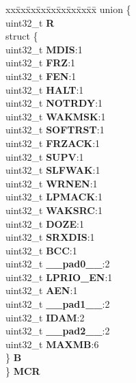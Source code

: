 \begin{DoxyCompactItemize}
\begin{tabbing}
\end{tabbing}\item 
\mbox{\label{structFLEXCAN__tag_a0b0c0058de992e9a9ad5708346fd0e9e}} 
\begin{tabbing}
xx\=xx\=xx\=xx\=xx\=xx\=xx\=xx\=xx\=\kill
union \{\\
\>uint32\_t {\bfseries R}\\
\>struct \{\\
\>\>uint32\_t {\bfseries MDIS}:1\\
\>\>uint32\_t {\bfseries FRZ}:1\\
\>\>uint32\_t {\bfseries FEN}:1\\
\>\>uint32\_t {\bfseries HALT}:1\\
\>\>uint32\_t {\bfseries NOTRDY}:1\\
\>\>uint32\_t {\bfseries WAKMSK}:1\\
\>\>uint32\_t {\bfseries SOFTRST}:1\\
\>\>uint32\_t {\bfseries FRZACK}:1\\
\>\>uint32\_t {\bfseries SUPV}:1\\
\>\>uint32\_t {\bfseries SLFWAK}:1\\
\>\>uint32\_t {\bfseries WRNEN}:1\\
\>\>uint32\_t {\bfseries LPMACK}:1\\
\>\>uint32\_t {\bfseries WAKSRC}:1\\
\>\>uint32\_t {\bfseries DOZE}:1\\
\>\>uint32\_t {\bfseries SRXDIS}:1\\
\>\>uint32\_t {\bfseries BCC}:1\\
\>\>uint32\_t {\bfseries \_\_pad0\_\_}:2\\
\>\>uint32\_t {\bfseries LPRIO\_EN}:1\\
\>\>uint32\_t {\bfseries AEN}:1\\
\>\>uint32\_t {\bfseries \_\_pad1\_\_}:2\\
\>\>uint32\_t {\bfseries IDAM}:2\\
\>\>uint32\_t {\bfseries \_\_pad2\_\_}:2\\
\>\>uint32\_t {\bfseries MAXMB}:6\\
\>\} {\bfseries B}\\
\} {\bfseries MCR}\\


\end{tabbing}
\end{DoxyCompactItemize}
